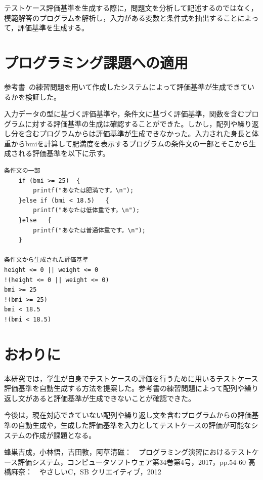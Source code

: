 \documentclass[10pt]{tpu-abst}
\begin{document}
テストケース評価基準を生成する際に，問題文を分析して記述するのではなく，模範解答のプログラムを解析し，入力がある変数と条件式を抽出することによって，評価基準を生成する。
\section{プログラミング課題への適用}
参考書~\cite{b1}の練習問題を用いて作成したシステムによって評価基準が生成できているかを検証した。

入力データの型に基づく評価基準や，条件文に基づく評価基準，関数を含むプログラムに対する評価基準の生成は確認することができた。しかし，配列や繰り返し分を含むプログラムからは評価基準が生成できなかった。入力された身長と体重からbmiを計算して肥満度を表示するプログラムの条件文の一部とそこから生成される評価基準を以下に示す。
\begin{lstlisting}
条件文の一部
	if (bmi >= 25)	{
		printf("あなたは肥満です。\n");
	}else if (bmi < 18.5)	{
		printf("あなたは低体重です。\n");
	}else	{
		printf("あなたは普通体重です。\n");
	}

条件文から生成された評価基準
height <= 0 || weight <= 0
!(height <= 0 || weight <= 0)
bmi >= 25
!(bmi >= 25)
bmi < 18.5
!(bmi < 18.5)
\end{lstlisting}

\section{おわりに}
本研究では，学生が自身でテストケースの評価を行うために用いるテストケース評価基準を自動生成する方法を提案した。参考書の練習問題によって配列や繰り返し文があると評価基準が生成できないことが確認できた。

今後は，現在対応できていない配列や繰り返し文を含むプログラムからの評価基準の自動生成や，生成した評価基準を入力としてテストケースの評価が可能なシステムの作成が課題となる。

\begin{thebibliography}{2}
  {\small 蜂巣吉成，小林悟，吉田敦，阿草清磁：　プログラミング演習におけるテストケース評価システム，コンピュータソフトウェア第34巻第4号，2017，pp.54-60}
  高橋麻奈：　やさしいC，SB クリエイティブ，2012
\end{thebibliography}
%
\end{document}
